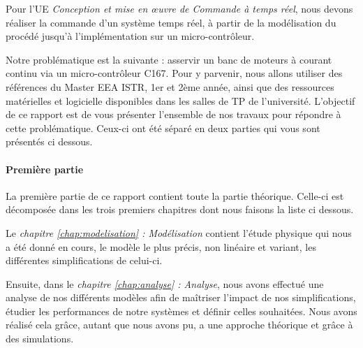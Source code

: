 
Pour l'UE \emph{Conception et mise en œuvre de Commande à temps réel}, nous devons réaliser la commande d’un système temps réel, à partir de la modélisation du procédé jusqu'à l'implémentation sur un micro-contrôleur. 

Notre problématique est la suivante : asservir un banc de moteurs à courant continu via un micro-contrôleur C167. Pour y parvenir, nous allons utiliser des références du Master EEA ISTR, 1er et 2ème année, ainsi que des ressources matérielles et logicielle disponibles dans les salles de TP de l'université. L'objectif de ce rapport est de vous présenter l'ensemble de nos travaux pour répondre à cette problématique. Ceux-ci ont été séparé en deux parties qui vous sont présentés ci dessous.

\paragraph*{Première partie}
La première partie de ce rapport contient toute la partie théorique. Celle-ci est décomposée dans les trois premiers chapitres dont nous faisons la liste ci dessous.

Le \emph{chapitre \ref{chap:modelisation} : Modélisation} contient l'étude physique qui nous a été donné en cours, le modèle le plus précis, non linéaire et variant, les différentes simplifications de celui-ci. 

Ensuite, dans le \emph{chapitre \ref{chap:analyse} : Analyse}, nous avons effectué une analyse de nos différents modèles afin de maîtriser l’impact de nos simplifications, étudier les performances de notre systèmes et définir celles souhaitées. Nous avons réalisé cela grâce, autant que nous avons pu, a une approche théorique et grâce à des simulations.


